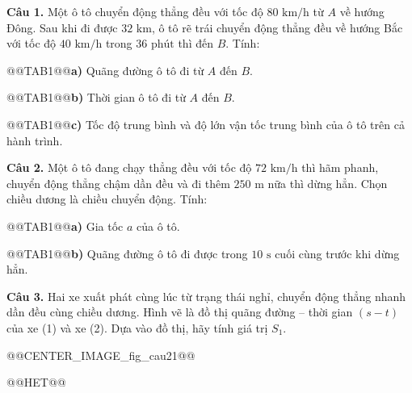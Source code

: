 \documentclass{article}
\begin{document}
\textbf{Câu 1.} Một ô tô chuyển động thẳng đều với tốc độ $80\text{ km/h}$ từ $A$ về hướng Đông. Sau khi đi được $32\text{ km}$, ô tô rẽ trái chuyển động thẳng đều về hướng Bắc với tốc độ $40\text{ km/h}$ trong $36\text{ phút}$ thì đến $B$. Tính:

@@TAB1@@\textbf{a)} Quãng đường ô tô đi từ $A$ đến $B$.

@@TAB1@@\textbf{b)} Thời gian ô tô đi từ $A$ đến $B$.

@@TAB1@@\textbf{c)} Tốc độ trung bình và độ lớn vận tốc trung bình của ô tô trên cả hành trình.

\textbf{Câu 2.} Một ô tô đang chạy thẳng đều với tốc độ $72\text{ km/h}$ thì hãm phanh, chuyển động thẳng chậm dần đều và đi thêm $250\text{ m}$ nữa thì dừng hẳn. Chọn chiều dương là chiều chuyển động. Tính:

@@TAB1@@\textbf{a)} Gia tốc $a$ của ô tô.

@@TAB1@@\textbf{b)} Quãng đường ô tô đi được trong $10\text{ s}$ cuối cùng trước khi dừng hẳn.

\textbf{Câu 3.} Hai xe xuất phát cùng lúc từ trạng thái nghỉ, chuyển động thẳng nhanh dần đều cùng chiều dương. Hình vẽ là đồ thị quãng đường -- thời gian $(s - t)$ của xe (1) và xe (2). Dựa vào đồ thị, hãy tính giá trị $S_1$.

@@CENTER_IMAGE_fig_cau21@@



@@HET@@
\end{document}
